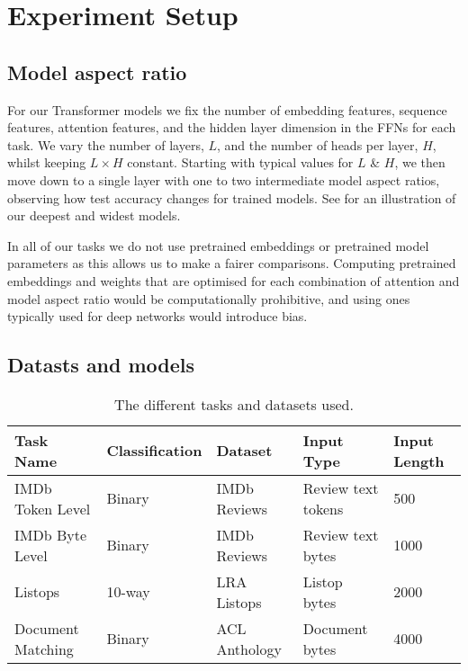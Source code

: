\section{Experiment Setup}

\subsection{Model aspect ratio}\label{section:method:ratio}

For our Transformer models we fix the number of embedding features, sequence features, attention features, and the hidden layer dimension in the FFNs for each task.
We vary the number of layers, $L$, and the number of heads per layer, $H$, whilst keeping $L \times H$ constant.
Starting with typical values for $L$ \& $H$, we then move down to a single layer with one to two intermediate model aspect ratios, observing how test accuracy changes for trained models.
See  for an illustration of our deepest and widest models.

In all of our tasks we do not use pretrained embeddings or pretrained model parameters as this allows us to make a fairer comparisons.
Computing pretrained embeddings and weights that are optimised for each combination of attention and model aspect ratio would be computationally prohibitive, and using ones typically used for deep networks would introduce bias.


\subsection{Datasts and models}\label{section:method:datasets}

\begin{table}[!h]
    \caption{The different tasks and datasets used.}
    \label{table:tasks}
    \begin{center}
        \begin{tabular}{l | l l l l}
            \toprule
            \textbf{Task Name} & \textbf{Classification} & \textbf{Dataset} & \textbf{Input Type} & \textbf{Input Length} \\
            \midrule
            IMDb Token Level & Binary & IMDb Reviews & Review text tokens & 500 \\
            IMDb Byte Level & Binary & IMDb Reviews & Review text bytes & 1000 \\
            Listops & 10-way & LRA Listops & Listop bytes & 2000 \\
            Document Matching & Binary & ACL Anthology & Document bytes & 4000 \\
            \bottomrule
        \end{tabular}
    \end{center}
\end{table}

